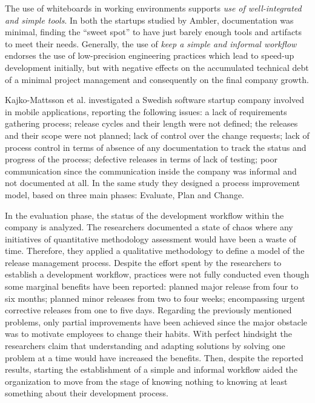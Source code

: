 \documentclass[10pt,journal,letterpaper,compsoc]{IEEEtran}
\begin{document}
The use of whiteboards in working environments supports \textit{use of 
well-integrated and simple tools}. In both the startups studied by Ambler, 
documentation was minimal, finding the ``sweet spot'' to have just barely enough 
tools and artifacts to meet their needs. Generally, the use of \textit{keep a 
simple and informal workflow} endorses the use of low-precision engineering 
practices which lead to speed-up development initially, but with negative 
effects on the accumulated technical debt of a minimal project management and 
consequently on the final company growth. 

Kajko-Mattsson et al. \cite{Kajko-Mattsson2008} investigated a Swedish software 
startup company involved in mobile applications, reporting the following issues: 
a lack of requirements gathering process; release cycles and their length were 
not defined; the releases and their scope were not planned; lack of control over 
the change requests; lack of process control in terms of  absence of any 
documentation to track the status and progress of the process; defective 
releases in terms of lack of testing; poor communication since the communication 
inside the company was informal and not documented at all. In the same study 
they designed a process improvement model, based on three main phases: Evaluate, 
Plan and Change. 

In the evaluation phase, the status of the development workflow within the 
company  is analyzed. The researchers documented a state of chaos where any 
initiatives of quantitative methodology assessment would have been a waste of 
time. Therefore, they applied a qualitative methodology to define a model of the 
release management process. 
Despite the effort spent by the researchers to establish a development workflow, 
practices were not fully conducted even though some marginal benefits have been 
reported: planned major release from four to six months; planned minor releases 
from two to four weeks; encompassing urgent corrective releases from one to five 
days. 
Regarding the previously mentioned problems, only 
partial improvements have been achieved since the major obstacle was to 
motivate employees to change their habits. With perfect hindsight the 
researchers claim that understanding and adapting solutions by solving one 
problem at a time would have increased the benefits. Then, despite the reported 
results, starting the establishment of a simple and informal workflow aided the 
organization to move from the stage of knowing nothing to knowing at least 
something about their development process. 
\end{document}
